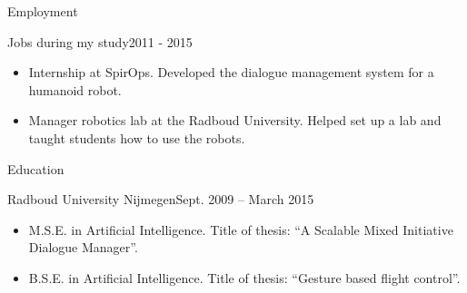 \documentclass[]{mcdowellcv}
\begin{document}
\begin{cvsection}{Employment}
\begin{cvsubsection}{Jobs during my study}{}{2011 - 2015}
			\begin{itemize}
				\item Internship at SpirOps.  Developed the dialogue management system for a humanoid robot. 
				\item Manager robotics lab at the Radboud University.  Helped set up a lab and taught students how to use the robots. 
			\end{itemize}
		\end{cvsubsection}



	\end{cvsection}



	\begin{cvsection}{Education}
		\begin{cvsubsection}{}{Radboud University Nijmegen}{Sept.  2009 -- March 2015}
			\begin{itemize}
				\item M.S.E. in Artificial Intelligence. Title of thesis: ``A Scalable Mixed Initiative Dialogue Manager''. 
				\item B.S.E. in Artificial Intelligence. Title of thesis: ``Gesture based flight control''.
			\end{itemize}
		\end{cvsubsection}
	\end{cvsection}
	
\end{document}
